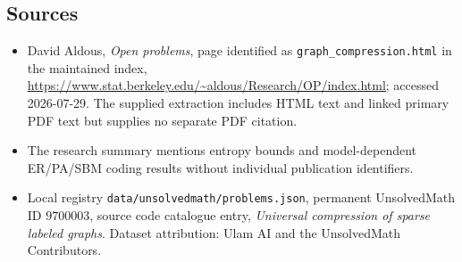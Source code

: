 \documentclass[11pt]{article}
\begin{document}
\subsection{Sources}
\begin{itemize}
\item David Aldous, \emph{Open problems}, page identified as \texttt{graph\_compression.html} in the maintained index, \url{https://www.stat.berkeley.edu/~aldous/Research/OP/index.html}; accessed 2026-07-29. The supplied extraction includes HTML text and linked primary PDF text but supplies no separate PDF citation.
\item The research summary mentions entropy bounds and model-dependent ER/PA/SBM coding results without individual publication identifiers.
\item Local registry \texttt{data/unsolvedmath/problems.json}, permanent UnsolvedMath ID $9700003$, source code catalogue entry, \emph{Universal compression of sparse labeled graphs}. Dataset attribution: Ulam AI and the UnsolvedMath Contributors.
\end{itemize}
\end{document}
